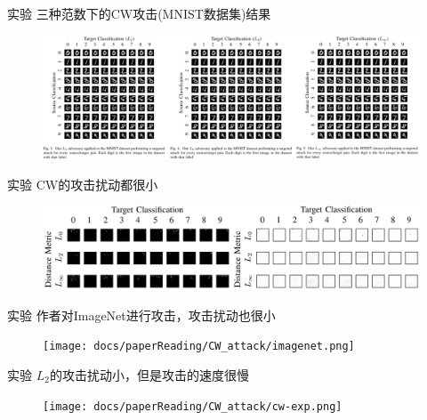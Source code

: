 \begin{frame}{实验}
    三种范数下的CW攻击(MNIST数据集)结果
    \begin{figure}
        \centering
        \includegraphics[width=1.0\textwidth]{docs/paperReading/CW_attack/attack-sample.png}
    \end{figure}
\end{frame}


\begin{frame}{实验}
    CW的攻击扰动都很小
    \begin{figure}
        \centering
        \includegraphics[width=1.0\textwidth]{docs/paperReading/CW_attack/per.png}
    \end{figure}
\end{frame}

\begin{frame}{实验}
    作者对ImageNet进行攻击，攻击扰动也很小
    \begin{figure}
        \centering
        \texttt{[image: docs/paperReading/CW\_attack/imagenet.png]}
    \end{figure}
\end{frame}

\begin{frame}{实验}
    $L_2$的攻击扰动小，但是攻击的速度很慢
    \begin{figure}
        \centering
        \texttt{[image: docs/paperReading/CW\_attack/cw-exp.png]}
    \end{figure}    
\end{frame}